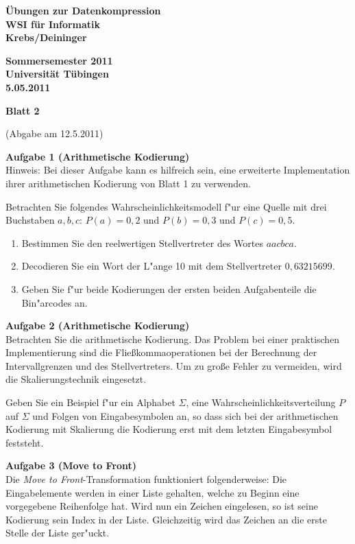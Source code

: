 \documentclass[a4paper]{article}
\def\header#1#2#3#4{\pagestyle{empty}
\noindent
\begin{minipage}[t]{0.6\textwidth}
\begin{flushleft}
\bf \"Ubungen zur Datenkompression\\
WSI f\"ur Informatik\\
Krebs/Deininger
\end{flushleft}
\end{minipage}
\begin{minipage}[t]{0.4\textwidth}
\begin{flushright}
\bf Sommersemester 2011\\
Universit\"at T\"ubingen\\
#2 %
\end{flushright}
\end{minipage}

\begin{center}
{\Large\bf Blatt #1}

{(Abgabe am #3)}
\end{center}
}
\begin{document}
\header{2}{5.05.2011}{12.5.2011}{}


{\bf Aufgabe 1  \quad(Arithmetische Kodierung)}\smallskip\\
Hinweis: Bei dieser Aufgabe kann es hilfreich sein, eine erweiterte Implementation ihrer arithmetischen Kodierung von Blatt 1 zu verwenden.

Betrachten Sie folgendes Wahrscheinlichkeitsmodell f"ur eine Quelle mit drei Buchstaben $a,b,c$: $P(a)=0,2$ und $P(b)=0,3$ und $P(c)=0,5$.
\begin{enumerate}
\item Bestimmen Sie den reelwertigen Stellvertreter des Wortes $aacbca$.
\item Decodieren Sie ein Wort der L"ange 10 mit dem Stellvertreter $0,63215699$.
\item Geben Sie f"ur beide Kodierungen der ersten beiden Aufgabenteile die Bin"arcodes an.
\end{enumerate}


\bigskip


{\bf Aufgabe 2  \quad(Arithmetische Kodierung)}\smallskip\\
Betrachten Sie die arithmetische Kodierung. Das Problem bei einer praktischen Implementierung sind die Flie{\ss}kommaoperationen bei der Berechnung der Intervallgrenzen und des Stellvertreters. Um zu gro{\ss}e Fehler zu vermeiden, wird die Skalierungstechnik eingesetzt.

Geben Sie ein Beispiel f"ur ein Alphabet $\Sigma$, eine Wahrscheinlichkeitsverteilung $P$ auf $\Sigma$ und Folgen von Eingabesymbolen an, so dass sich bei der arithmetischen Kodierung mit Skalierung die Kodierung erst mit dem letzten Eingabesymbol feststeht.

\bigskip

{\bf Aufgabe 3  \quad(Move to Front)}\smallskip\\
Die {\em Move to Front}-Transformation funktioniert folgenderweise: Die Eingabelemente werden in einer Liste gehalten, welche zu Beginn eine vorgegebene Reihenfolge hat. Wird nun ein Zeichen eingelesen, so ist seine Kodierung sein Index in der Liste. Gleichzeitig wird das Zeichen an die erste Stelle der Liste ger"uckt.
\end{document}
